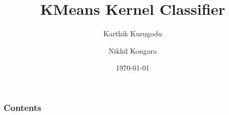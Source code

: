 \documentclass{beamer}
\title[KMeans Kernel Classifier]{KMeans Kernel Classifier} %
\author{Karthik Kurugodu \and Nikhil Kongara} %
\institute[] %
{
    IIT Hyderabad \\ %
    \medskip
    \textit{} %
}
\date{\today} %
\begin{document}
    \begin{frame}
        \titlepage %
    \end{frame}

    \begin{frame}
        \frametitle{Contents} %
        \tableofcontents %
    \end{frame}


\end{document}

